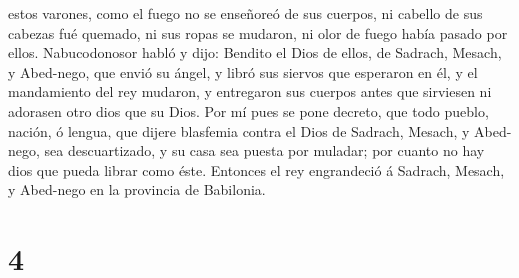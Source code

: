 estos varones, como el fuego no se enseñoreó de sus cuerpos, ni cabello
de sus cabezas fué quemado, ni sus ropas se mudaron, ni olor de fuego
había pasado por ellos.  Nabucodonosor habló y dijo:
Bendito el Dios de ellos, de Sadrach, Mesach, y Abed-nego, que envió su
ángel, y libró sus siervos que esperaron en él, y el mandamiento del rey
mudaron, y entregaron sus cuerpos antes que sirviesen ni adorasen otro
dios que su Dios.  Por mí pues se pone decreto, que todo
pueblo, nación, ó lengua, que dijere blasfemia contra el Dios de
Sadrach, Mesach, y Abed-nego, sea descuartizado, y su casa sea puesta
por muladar; por cuanto no hay dios que pueda librar como éste.
 Entonces el rey engrandeció á Sadrach, Mesach, y Abed-nego
en la provincia de Babilonia.

\hypertarget{section-3}{%
\section{4}\label{section-3}}

